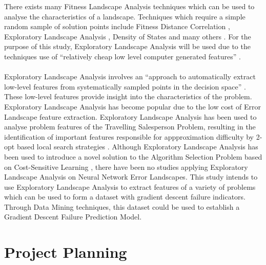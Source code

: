 \documentclass[runningheads,a4paper]{llncs}
\begin{document}
There exists many Fitness Landscape Analysis techniques which can be used to analyse the characteristics of a landscape. Techniques which require a simple random sample of solution points include Fitness Distance Correlation \cite{gallagher2001fitness}, 
Exploratory Landscape Analysis \cite{mersmann2011exploratory}, Density of States \cite{rose1996density} and many others \cite{malan2013survey}. For the purpose of this study, Exploratory Landscape Analysis 
will be used due to the techniques use of ``relatively cheap low level computer generated features'' \cite{mersmann2011exploratory}.
\\\\
Exploratory Landscape Analysis involves an ``approach to automatically extract low-level features from systematically sampled points in the decision space'' \cite{mersmann2011exploratory}. These low-level features provide insight into the characteristics
of the problem. Exploratory Landscape Analysis has become popular due to the low cost of Error Landscape feature extraction. Exploratory Landscape Analysis has been used to analyse problem features of the Travelling Salesperson Problem, resulting in
the identification of important features responsible for appproximation difficulty by 2-opt based local search strategies \cite{mersmann2013novel}. Although Exploratory Landscape Analysis has been used to introduce a novel solution to the 
Algorithm Selection Problem based on Cost-Sensitive Learning \cite{bischl2012algorithm}, there have been no studies applying Exploratory Landscape Analysis on Neural Network Error Landscapes. This study intends to use Exploratory Landscape Analysis to extract 
features of a variety of problems which can be used to form a dataset with gradient descent failure indicators. Through Data Mining techniques, this dataset could be used to establish a Gradient Descent Failure Prediction Model. 

\section{Project Planning}
 
\end{document}
